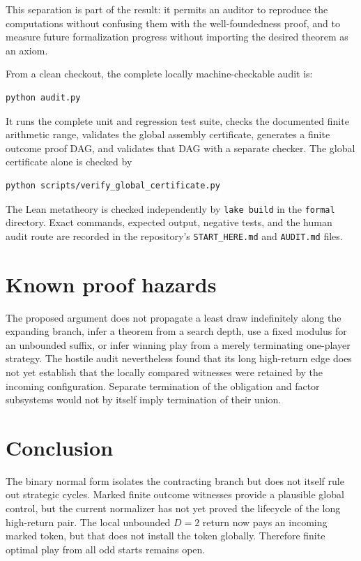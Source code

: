 \documentclass[11pt]{article}
\begin{document}
This separation is part of the result: it permits an auditor to reproduce the
computations without confusing them with the well-foundedness proof, and to
measure future formalization progress without importing the desired theorem
as an axiom.

From a clean checkout, the complete locally machine-checkable audit is:
\begin{verbatim}
python audit.py
\end{verbatim}
It runs the complete unit and regression test suite, checks the documented finite
arithmetic range, validates the global assembly certificate, generates a
finite outcome proof DAG, and validates that DAG with a separate checker. The
global certificate alone is checked by
\begin{verbatim}
python scripts/verify_global_certificate.py
\end{verbatim}
The Lean metatheory is checked independently by \texttt{lake build} in the
\texttt{formal} directory. Exact commands, expected output, negative tests,
and the human audit route are recorded in the repository's
\texttt{START\_HERE.md} and \texttt{AUDIT.md} files.

\section{Known proof hazards}

The proposed argument does not propagate a least draw indefinitely along the expanding
branch, infer a theorem from a search depth, use a fixed modulus for an
unbounded suffix, or infer winning play from a merely terminating one-player
strategy. The hostile audit nevertheless found that its long high-return edge
does not yet establish that the locally compared witnesses were retained by
the incoming configuration. Separate termination of the obligation and factor
subsystems would not by itself imply termination of their union.

\section{Conclusion}

The binary normal form isolates the contracting branch but does not itself
rule out strategic cycles. Marked finite outcome witnesses provide a plausible
global control, but the current normalizer has not yet proved the lifecycle of
the long high-return pair. The local unbounded $D=2$ return now pays an
incoming marked token, but that does not install the token globally.
Therefore finite optimal play from all odd starts remains open.
\end{document}
